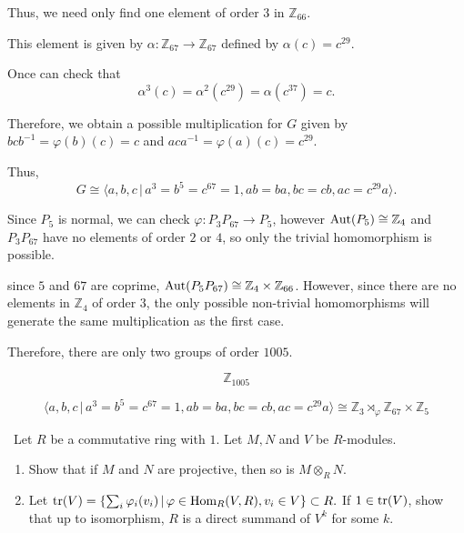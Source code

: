 \documentclass[12pt]{AlgebraQual}
\begin{document}
\begin{solution}
Thus, we need only find one element of order $3$ in $\mathbb{Z}_{66}.$

This element is given by $\alpha:\mathbb{Z}_{67}\to\mathbb{Z}_{67}$ defined by $\alpha(c)=c^{29}$.

Once can check that $$\alpha^3(c)=\alpha^2(c^{29})=\alpha(c^{37})=c.$$

Therefore, we obtain a possible multiplication for $G$ given by $bcb^{-1}=\varphi(b)(c)=c$ and $aca^{-1}=\varphi(a)(c)=c^{29}.$

Thus, $$G\cong\langle a,b,c\,|\, a^3=b^5=c^{67}=1,ab=ba,bc=cb,ac=c^{29}a\rangle.$$

 Since $P_5$ is normal, we can check $\varphi:P_3P_{67}\to P_5$, however $\text{Aut}(P_5)\cong\mathbb{Z}_4$ and $P_3P_{67}$ have no elements of order $2$ or $4$, so only the trivial homomorphism is possible.

 since $5$ and $67$ are coprime, $\text{Aut}(P_5P_{67})\cong\mathbb{Z}_4\times\mathbb{Z}_{66}$. However, since there are no elements in $\mathbb{Z}_4$ of order $3$, the only possible non-trivial homomorphisms will generate the same multiplication as the first case.

Therefore, there are only two groups of order $1005$.
\begin{center}
\begin{framed}
$$\mathbb{Z}_{1005}$$

$$\langle a,b,c\,|\, a^3=b^5=c^{67}=1,ab=ba,bc=cb,ac=c^{29}a\rangle\cong\mathbb{Z}_3\rtimes_\varphi\mathbb{Z}_{67}\times\mathbb{Z}_5$$
\end{framed}
\end{center}
\end{solution}
\newpage


\begin{problem} $\,$
Let $R$ be a commutative ring with $1$. Let $M,N$ and $V$ be $R$-modules.
\begin{enumerate}[label=(\alph*)]
    \item Show that if $M$ and $N$ are projective, then so is $M\otimes_RN$.
    \item Let $\text{tr}(V)=\{\sum_i\varphi_i(v_i)\,|\,\varphi\in\text{Hom}_R(V,R),v_i\in V\}\subset R.$ If $1\in\text{tr}(V)$, show that up to isomorphism, $R$ is a direct summand of $V^k$ for some $k.$
\end{enumerate}
\end{problem}
\end{document}
